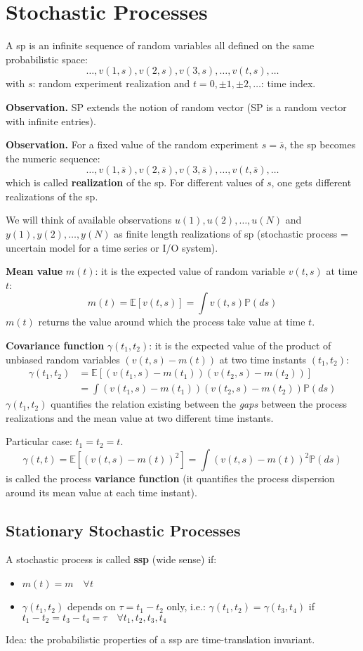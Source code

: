 \chapter{Stochastic Processes}
A \gls{sp} is an infinite sequence of random variables all defined on the same probabilistic space:
\[
	\ldots,v(1,s),v(2,s),v(3,s),\ldots,v(t,s),\ldots
\]
with $s$: random experiment realization and $t=0,\pm 1,\pm 2,\ldots$: time index.

\textbf{Observation.} SP extends the notion of random vector (SP is a random vector with infinite entries).

\textbf{Observation.} For a fixed value of the random experiment $s = \overline{s}$, the \gls{sp} becomes the numeric sequence:
\[
	\ldots,v(1,\overline{s}),v(2,\overline{s}),v(3,\overline{s}),\ldots,v(t,\overline{s}),\ldots
\]
which is called \textbf{realization} of the \gls{sp}.
For different values of $s$, one gets different realizations of the \gls{sp}.

We will think of available observations ${u(1),u(2),\ldots,u(N)}$ and ${y(1), y(2),\ldots, y(N)}$ as finite length realizations of \gls{sp} (stochastic process = uncertain model for a time series or I/O system).

\textbf{Mean value} $m(t)$: it is the expected value of random variable $v(t,s)$ at time $t$:
\[
	m(t)=\mathbb{E}[v(t, s)]=\int v(t, s) \mathbb{P}(ds)
\]
$m(t)$ returns the value around which the process take value at time $t$.

\textbf{Covariance function} $\gamma(t_{1}, t_{2})$: it is the expected value of the product of unbiased random variables $(v(t, s)-m(t))$ at two time instants $(t_{1}, t_{2}):$
\begin{align*}
	\gamma(t_{1}, t_{2}) &=\mathbb{E}[(v(t_{1}, s)-m(t_{1}))(v(t_{2}, s)-m(t_{2}))] \\
	&=\int(v(t_{1}, s)-m(t_{1}))(v(t_{2}, s)-m(t_{2})) \mathbb{P}(ds)
\end{align*}
$\gamma(t_{1}, t_{2})$ quantifies the relation existing between the \emph{gaps} between the process realizations and the mean value at two different time instants.

Particular case: $t_{1}=t_{2}=t$.
\[
	\gamma(t, t)=\mathbb{E}[(v(t, s)-m(t))^{2}]=\int(v(t, s)-m(t))^{2} \mathbb{P}(ds)
\]
is called the process \textbf{variance function} (it quantifies the process dispersion around its mean value at each time instant).

\section{Stationary Stochastic Processes}
A stochastic process is called \textbf{\gls{ssp}} (wide sense) if:
\begin{itemize}
	\item $m(t)=m \quad \forall t$
	\item $\gamma(t_{1}, t_{2})$ depends on $\tau=t_{1}-t_{2}$ only, i.e.: $\gamma(t_{1}, t_{2})=\gamma(t_{3}, t_{4})$ if $t_{1}-t_{2}=t_{3}-t_{4}=\tau \quad \forall t_{1}, t_{2}, t_{3}, t_{4}$
\end{itemize}
Idea: the probabilistic properties of a \gls{ssp} are time-translation invariant.

